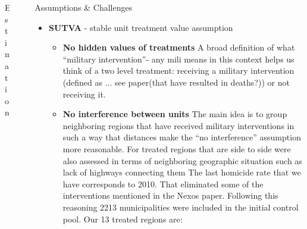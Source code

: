 \documentclass[final]{beamer}
\newlength{\sepwid}
\newlength{\onecolwid}
\newlength{\threecolwid}
\begin{document}
\begin{frame}[t]
\begin{columns}[t]
\begin{column}{\onecolwid}
\begin{block}{Estimation}
      \end{block}

    \end{column}

    \begin{column}{\sepwid}\end{column}			%
    \begin{column}{\threecolwid}					  %
		\begin{block}{Assumptions \& Challenges}
			\begin{itemize}
			\item \textbf{SUTVA} - stable unit treatment value assumption
			\begin{itemize}
				\item \textbf{No hidden values of treatments} A broad definition of what ``military intervention''- any mili means in this context helps us think of a two level treatment: receiving a military intervention (defined as ... see paper(that have resulted in deaths?)) or not receiving it.
				\item \textbf{No interference between units} The main idea is to group neighboring regions that have received military interventions in such a way that distances make the ``no interference'' assumption  more reasonable. For treated regions that are side to side were also assessed in terms of neighboring  geographic situation such as lack of highways connecting them %
		The last homicide rate that we have corresponds to 2010. That eliminated some of the interventions mentioned in the Nexos paper. 
		Following this reasoning 2213 municipalities were included in the initial control pool. Our 13 treated regions are:
		
	
		

\end{itemize}
\end{itemize}
\end{block}
\end{column}
\end{columns}
\end{frame}
\end{document}
